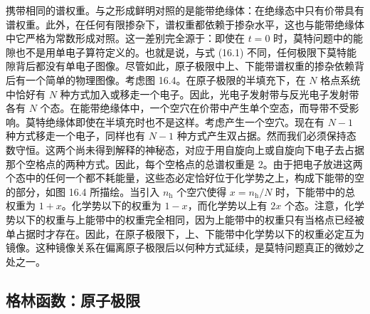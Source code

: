 携带相同的谱权重。与之形成鲜明对照的是能带绝缘体：在绝缘态中只有价带具有谱权重。此外，在任何有限掺杂下，谱权重都依赖于掺杂水平，这也与能带绝缘体中它严格为常数形成对照。这一差别完全源于：即使在 $t=0$ 时，莫特问题中的能隙也不是用单电子算符定义的。也就是说，与式 (16.1) 不同，任何极限下莫特能隙背后都没有单电子图像。尽管如此，原子极限中上、下能带谱权重的掺杂依赖背后有一个简单的物理图像。考虑图 16.4。在原子极限的半填充下，在 $N$ 格点系统中恰好有 $N$ 种方式加入或移走一个电子。因此，光电子发射带与反光电子发射带各有 $N$ 个态。在能带绝缘体中，一个空穴在价带中产生单个空态，而导带不受影响。莫特绝缘体即使在半填充时也不是这样。考虑产生一个空穴。现在有 $N-1$ 种方式移走一个电子，同样也有 $N-1$ 种方式产生双占据。然而我们必须保持态数守恒。这两个尚未得到解释的神秘态，对应于用自旋向上或自旋向下电子去占据那个空格点的两种方式。因此，每个空格点的总谱权重是 2。由于把电子放进这两个态中的任何一个都不耗能量，这些态必定恰好位于化学势之上，构成下能带的空的部分，如图 16.4 所描绘。当引入 $n_{\mathrm{h}}$ 个空穴使得 $x=n_{\mathrm{h}}/N$ 时，下能带中的总权重为 $1+x$。化学势以下的权重为 $1-x$，而化学势以上有 $2x$ 个态。注意，化学势以下的权重与上能带中的权重完全相同，因为上能带中的权重只有当格点已经被单占据时才存在。因此，在原子极限下，上、下能带中化学势以下的权重必定互为镜像。这种镜像关系在偏离原子极限后以何种方式延续，是莫特问题真正的微妙之处之一。

\subsection{格林函数：原子极限}

